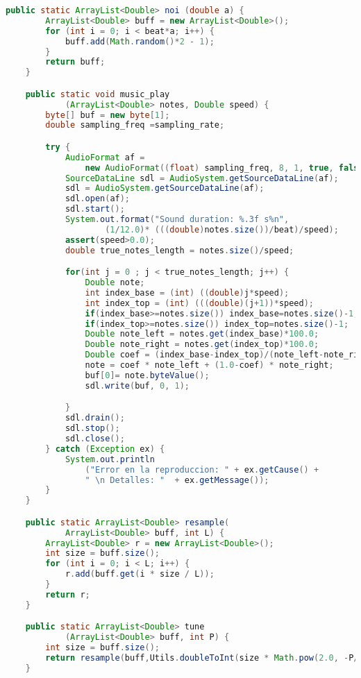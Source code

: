 \documentclass[a4paper]{article}
\begin{document}
\begin{lstlisting}[language=Java]
    public static ArrayList<Double> noi (double a) {
        ArrayList<Double> buff = new ArrayList<Double>();
        for (int i = 0; i < beat*a; i++) {
            buff.add(Math.random()*2 - 1);
        }
        return buff;
    }

    public static void music_play
            (ArrayList<Double> notes, Double speed) {
        byte[] buf = new byte[1];
        double sampling_freq =sampling_rate;

        try {
            AudioFormat af = 
                new AudioFormat((float) sampling_freq, 8, 1, true, false);
            SourceDataLine sdl = AudioSystem.getSourceDataLine(af);
            sdl = AudioSystem.getSourceDataLine(af);
            sdl.open(af);
            sdl.start();
            System.out.format("Sound duration: %.3f s%n", 
                    (1/12.0)* (((double)notes.size())/beat)/speed);
            assert(speed>0.0);
            double true_notes_length = notes.size()/speed;

            for(int j = 0 ; j < true_notes_length; j++) {
                Double note;
                int index_base = (int) ((double)j*speed);
                int index_top = (int) (((double)(j+1))*speed);
                if(index_base>=notes.size()) index_base=notes.size()-1;
                if(index_top>=notes.size()) index_top=notes.size()-1;
                Double note_left = notes.get(index_base)*100.0;
                Double note_right = notes.get(index_top)*100.0;
                Double coef = (index_base-index_top)/(note_left-note_right) ;
                note = coef * note_left + (1.0-coef) * note_right;
                buf[0]= note.byteValue();
                sdl.write(buf, 0, 1);

            }
            sdl.drain();
            sdl.stop();
            sdl.close();
        } catch (Exception ex) {
            System.out.println
                ("Error en la reproduccion: " + ex.getCause() + 
                " \n Detalles: "  + ex.getMessage());
        }
    }

    public static ArrayList<Double> resample(
            ArrayList<Double> buff, int L) {
        ArrayList<Double> r = new ArrayList<Double>();
        int size = buff.size();
        for (int i = 0; i < L; i++) {
            r.add(buff.get(i * size / L));
        }
        return r;
    }

    public static ArrayList<Double> tune
            (ArrayList<Double> buff, int P) {
        int size = buff.size();
        return resample(buff,Utils.doubleToInt(size * Math.pow(2.0, -P/12.0)));
    }


\end{lstlisting}
\end{document}
